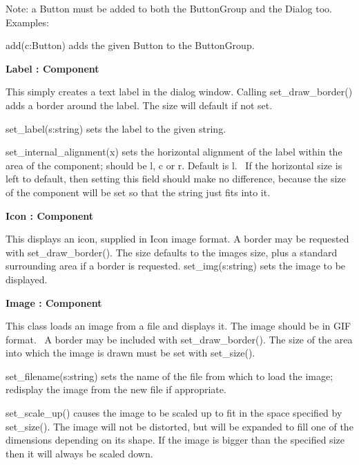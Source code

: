 Note: a Button must be added to both the ButtonGroup and the Dialog too.
Examples:


add(c:Button) adds the given Button to the ButtonGroup.

{\sffamily\bfseries
{}Label : Component}

This simply creates a text label in the dialog window. Calling
set\_draw\_border() adds a border around the label. The size will
default if not set.

set\_label(s:string) sets the label to the given string.

set\_internal\_alignment(x) sets the horizontal alignment of the label
within the area of the component; should be
{\textquotedbl}l{\textquotedbl}, {\textquotedbl}c{\textquotedbl} or
{\textquotedbl}r{\textquotedbl}. Default is
{\textquotedbl}l{\textquotedbl}. \ If the horizontal size is left to
default, then setting this field should make no difference, because the
size of the component will be set so that the string just fits into it.

{\sffamily\bfseries
{}Icon : Component}

This displays an icon, supplied in Icon image format. A border may be
requested with set\_draw\_border(). The size defaults to the
image{\textquotesingle}s size, plus a standard surrounding area if a
border is requested. set\_img(s:string) sets the image to be displayed.

{\sffamily\bfseries
{}Image : Component}

This class loads an image from a file and displays it. The image should
be in GIF format. \ A border may be included with set\_draw\_border().
The size of the area into which the image is drawn must be set with
set\_size().

set\_filename(s:string) sets the name of the file from which to load the
image; redisplay the image from the new file if appropriate.

set\_scale\_up() causes the image to be scaled up to fit in the space
specified by set\_size(). The image will not be distorted, but will be
expanded to fill one of the dimensions depending on its shape. If the
image is bigger than the specified size then it will always be scaled
down.

